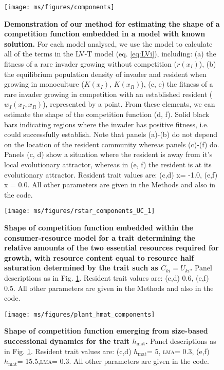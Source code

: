 \documentclass[a4paper,11pt]{article}
\newcommand{\hmat}{\ensuremath{h_{\text{mat}}}}
\newcommand{\lma}{\textsc{lma}}
\begin{document}
\clearpage

\begin{figure}[ht]
 \centering
 \texttt{[image: ms/figures/components]}
 \caption{{\bf Demonstration of our method for estimating the shape of a competition function embedded in a model with known solution.} For each model analysed, we use the model to calculate all of the terms in the LV-T model (eq. \ref{eq:LVi}), including: (a) the fitness of a rare invader growing without competition ($r(x_I)$), (b) the equilibrium population density of invader and resident when growing in monoculture ($K(x_I)$, $K(x_R)$), (c, e) the fitness of a rare invader growing in competition with an established resident ($w_I(x_I, x_R)$), represented by a point. From these elements, we can estimate the shape of the competition function (d, f). Solid black bars indicating regions where the invader has positive fitness, i.e. could successfully establish. Note that panels (a)-(b) do not depend on the location of the resident community whereas panels (c)-(f) do. Panels (c, d) show a situation where the resident is away from it's local evolutionary attractor, whereas in (e, f) the resident is at its evolutionary attractor. Resident trait values are: (c,d) x= -1.0, (e,f) x = 0.0. All other parameters are given in the Methods and also in the code.}
\label{fig:components}
\end{figure}

\clearpage


\clearpage

\begin{figure}[ht]
 \centering
 \texttt{[image: ms/figures/rstar\_components\_UC\_1]}
 \caption{{\bf Shape of competition function embedded within the consumer-resource model for a trait determining the relative amounts of the two essential resources required for growth, with resource content equal to resource half saturation determined by the trait such as $C_{ki} = U_{ki}$.} Panel descriptions as in Fig. \ref{fig:components}. Resident trait values are: (c,d) 0.6, (e,f) 0.5. All other parameters are given in the Methods and also in the code.} 
 \label{fig:rstar_components_UC1}
\end{figure}


\clearpage

\begin{figure}[ht]
 \centering
 \texttt{[image: ms/figures/plant\_hmat\_components]}
 \caption{{\bf Shape of competition function emerging from size-based successional dynamics for the trait \hmat.} 
	Panel descriptions as in Fig. \ref{fig:components}. Resident trait values are: (c,d) \hmat = 5, \lma = 0.3, (e,f) \hmat = 15.5,\lma = 0.3. All other parameters are given in the code.}
 \label{fig:plant_hmat}
\end{figure}
\end{document}
